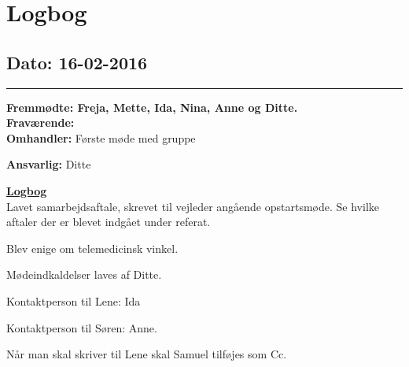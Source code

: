 \chapter{Logbog}
\section{Dato: 16-02-2016}
\hrule
\textbf{Fremmødte: Freja, Mette, Ida, Nina, Anne og Ditte.} \\
\textbf{Fraværende: } \\
\textbf{Omhandler:} Første møde med gruppe

\textbf{Ansvarlig:} Ditte 

\underline{\textbf{Logbog}}\\
Lavet samarbejdsaftale, skrevet til vejleder angående opstartsmøde. Se hvilke aftaler der er blevet indgået under referat. 

Blev enige om telemedicinsk vinkel.

Mødeindkaldelser laves af Ditte.

Kontaktperson til Lene: Ida

Kontaktperson til Søren: Anne.

Når man skal skriver til Lene skal Samuel tilføjes som Cc. 






